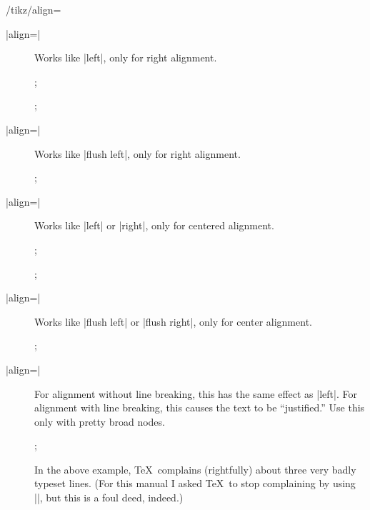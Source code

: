 \begin{key}{/tikz/align=}
\begin{description}
  \item[|align=|]
    Works like |left|, only for right alignment.
\begin{codeexample}[]
\tikz {};
\end{codeexample}
\begin{codeexample}[]
\tikz {};
\end{codeexample}

  \item[|align=|]
    Works like |flush left|, only for right alignment.
\begin{codeexample}[]
\tikz {};
\end{codeexample}

  \item[|align=|]
    Works like |left| or |right|, only for centered alignment.
\begin{codeexample}[]
\tikz {};
\end{codeexample}
\begin{codeexample}[]
\tikz {};
\end{codeexample}

  \item[|align=|]
    Works like |flush left| or |flush right|, only for center alignment.
\begin{codeexample}[]
\tikz {};
\end{codeexample}

  \item[|align=|]
    For alignment without line breaking, this has the same effect as
    |left|. For alignment with line breaking, this causes the text to
    be ``justified.'' Use this
  only with pretty broad nodes.
{%
\begin{codeexample}[]
\tikz {};
\end{codeexample}
}
  In the above example, \TeX\ complains (rightfully) about three very
  badly typeset lines. (For this manual I asked \TeX\ to stop
  complaining by using ||, but this is a foul deed,
  indeed.)


\end{description}
\end{key}
